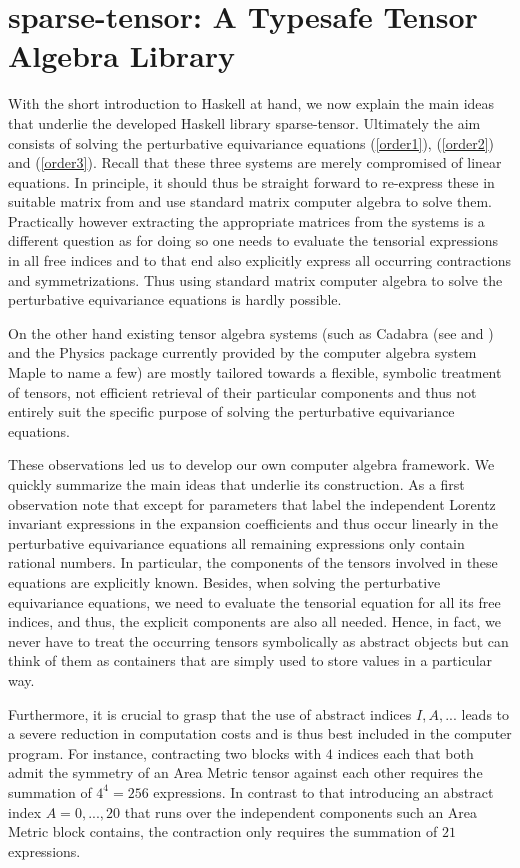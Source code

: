 \documentclass[a4paper,12pt, DIV=14, BCOR=5mm, twoside, headsepline, numbers=noenddot]{scrbook}
\begin{document}
\section{sparse-tensor: A Typesafe Tensor Algebra Library }
With the short introduction to Haskell at hand, we now explain the main ideas that underlie the developed Haskell library sparse-tensor. Ultimately the aim consists of solving the perturbative equivariance equations (\ref{order1}), (\ref{order2}) and (\ref{order3}). Recall that these three systems are merely compromised of linear equations. In principle, it should thus be straight forward to re-express these in suitable matrix from and use standard matrix computer algebra to solve them. Practically however extracting the appropriate matrices from the systems is a different question as for doing so one needs to evaluate the tensorial expressions in all free indices and to that end also
explicitly express all occurring contractions and symmetrizations.
Thus using standard matrix computer algebra to solve the perturbative equivariance equations is hardly possible.

On the other hand existing tensor algebra systems (such as Cadabra (see \cite{cadabra1} and \cite{cadabra2}) and the Physics package currently provided by the computer algebra system Maple to name a few) are mostly tailored towards a flexible, symbolic treatment of tensors, not efficient retrieval of their particular components and thus not entirely suit the specific purpose of solving the perturbative equivariance equations. 

These observations led us to develop our own computer algebra framework. We quickly summarize the main ideas that underlie its construction.
As a first observation note that except for parameters that label the independent Lorentz invariant expressions in the expansion coefficients and thus occur linearly in the perturbative equivariance equations all remaining expressions only contain rational numbers. In particular, the components of the tensors involved in these equations are explicitly known. Besides, when solving the perturbative equivariance equations, we need to evaluate the tensorial equation for all its free indices, and thus, the explicit components are also all needed. Hence, in fact, we never have to treat the occurring tensors symbolically as abstract objects but can think of them as containers that are simply used to store values in a particular way. 

Furthermore, it is crucial to grasp that the use of abstract indices $I, A, ...$ leads to a severe reduction in computation costs and is thus best included in the computer program. For instance, contracting two blocks with $4$ indices each that both admit the symmetry of an Area Metric tensor against each other requires the summation of $4^4 = 256$ expressions. In contrast to that introducing an abstract index $A = 0,...,20$ that runs over the independent components such an Area Metric block contains, the contraction only requires the summation of $21$ expressions.
\end{document}
